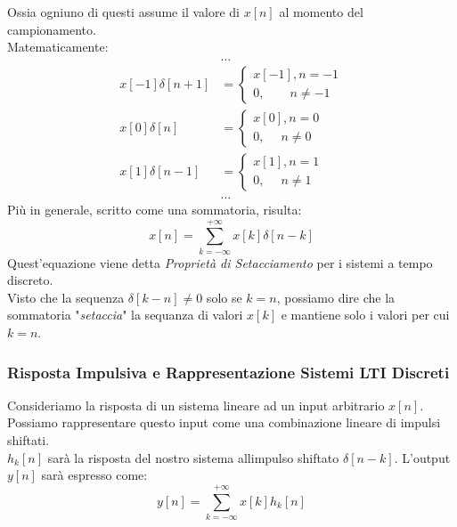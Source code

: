 \documentclass{article}
\begin{document}
				\begin{center}
				\end{center}
				Ossia ogniuno di questi assume il valore di $ x[n] $ al momento del campionamento. \\
				Matematicamente:
				\[
					\begin{aligned}
						& \dots \\
						x[-1]\delta[n+1]&=
						\begin{cases}
							x[-1], n=-1 \\
							0,\quad\quad n\neq -1
						\end{cases} \\
						x[0]\delta[n]&=
						\begin{cases}
							x[0], n=0 \\
							0,\quad\; n\neq 0
						\end{cases} \\
						x[1]\delta[n-1]&=
						\begin{cases}
							x[1], n=1 \\
							0,\quad\; n\neq 1
						\end{cases} \\
						& \dots
					\end{aligned}
				\]
				Più in generale, scritto come una sommatoria, risulta:
				\[
					x[n] = \sum_{k=-\infty}^{+\infty} {x[k]\delta[n-k]}
				\]
				Quest'equazione viene detta \textit{Proprietà di Setacciamento} per i sistemi a tempo discreto. \\
				Visto che la sequenza $ \delta[k-n]\neq 0 $ solo se $ k=n $, possiamo dire che la sommatoria "\textit{setaccia}" la sequanza di valori $ x[k] $ e mantiene solo i valori per cui $ k=n $.

			\subsubsection{Risposta Impulsiva e Rappresentazione Sistemi LTI Discreti}
				Consideriamo la risposta di un sistema lineare ad un input arbitrario $ x[n] $. Possiamo rappresentare questo input come una combinazione lineare di impulsi shiftati. \\
				$ h_{k}[n] $ sarà la risposta del nostro sistema allimpulso shiftato $ \delta[n-k] $. L'output $ y[n] $ sarà espresso come:
				\[
					y[n] = \sum_{k=-\infty}^{+\infty} {x[k] h_{k}[n]}
				\]
\end{document}
